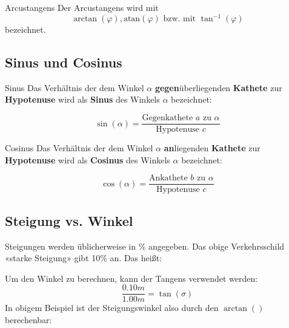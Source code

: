 \begin{bemerkung}{Arcustangens}{}
  Der Arcustangens wird mit
  $$\arctan(\varphi), \text{atan}(\varphi) \text{ bzw. mit } \tan^{-1}(\varphi)$$
    bezeichnet.
  \end{bemerkung}


\subsection{Sinus und Cosinus}


\begin{definition}{Sinus}{}
  Das Verhältnis der dem Winkel $\alpha$ \textbf{gegen}überliegenden \textbf{Kathete} zur \textbf{Hypotenuse}
  wird als \textbf{Sinus} des Winkels $\alpha$ bezeichnet:

  $$\sin(\alpha) = \frac{\text{Gegenkathete } a \text{ zu } \alpha}
  {\text{Hypotenuse } c}$$
\end{definition}

\begin{definition}{Cosinus}{}
  Das Verhältnis der dem Winkel $\alpha$ \textbf{an}liegenden \textbf{Kathete} zur \textbf{Hypotenuse}
  wird als \textbf{Cosinus}  des Winkels $\alpha$ bezeichnet:

  $$\cos(\alpha) = \frac{\text{Ankathete } b \text{ zu } \alpha}
  {\text{Hypotenuse } c}$$
\end{definition}

\newpage


\newpage


\subsection{Steigung vs. Winkel}

Steigungen werden üblicherweise in \% angegeben. Das obige
Verkehrsschild «starke Steigung» gibt 10\% an. Das heißt:


Um den Winkel zu berechnen, kann der Tangens verwendet werden:
$$\frac{0.10m}{1.00m} = \tan(\sigma)$$
In obigem Beispiel ist der Steigungswinkel also durch den $\arctan()$
berechenbar:

